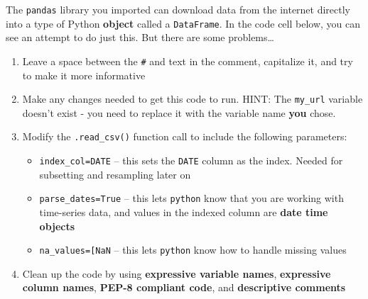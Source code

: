 \documentclass[
  letterpaper,
  DIV=11,
  numbers=noendperiod,
  oneside]{scrreprt}
\providecommand{\tightlist}{%
  \setlength{\itemsep}{0pt}\setlength{\parskip}{0pt}}
\begin{document}
The \texttt{pandas} library you imported can download data from the
internet directly into a type of Python \textbf{object} called a
\texttt{DataFrame}. In the code cell below, you can see an attempt to do
just this. But there are some problems\ldots{}

\begin{tcolorbox}[enhanced jigsaw, colbacktitle=quarto-callout-color!10!white, opacityback=0, bottomtitle=1mm, toptitle=1mm, bottomrule=.15mm, left=2mm, colframe=quarto-callout-color-frame, leftrule=.75mm, opacitybacktitle=0.6, colback=white, rightrule=.15mm, toprule=.15mm, breakable, titlerule=0mm, title=\textcolor{quarto-callout-color}{\faInfo}\hspace{0.5em}{Try It: Fix some code!}, coltitle=black, arc=.35mm]

\begin{enumerate}
\def\labelenumi{\arabic{enumi}.}
\item
  Leave a space between the \texttt{\#} and text in the comment,
  capitalize it, and try to make it more informative
\item
  Make any changes needed to get this code to run. HINT: The
  \texttt{my\_url} variable doesn't exist - you need to replace it with
  the variable name \textbf{you} chose.
\item
  Modify the \texttt{.read\_csv()} function call to include the
  following parameters:

  \begin{itemize}
  \tightlist
  \item
    \texttt{index\_col=\textquotesingle{}DATE\textquotesingle{}} -- this
    sets the \texttt{DATE} column as the index. Needed for subsetting
    and resampling later on
  \item
    \texttt{parse\_dates=True} -- this lets \texttt{python} know that
    you are working with time-series data, and values in the indexed
    column are \textbf{date time objects}
  \item
    \texttt{na\_values={[}\textquotesingle{}NaN\textquotesingle{}{]}} --
    this lets \texttt{python} know how to handle missing values
  \end{itemize}
\item
  Clean up the code by using \textbf{expressive variable names},
  \textbf{expressive column names}, \textbf{PEP-8 compliant code}, and
  \textbf{descriptive comments}
\end{enumerate}

\end{tcolorbox}
\end{document}
